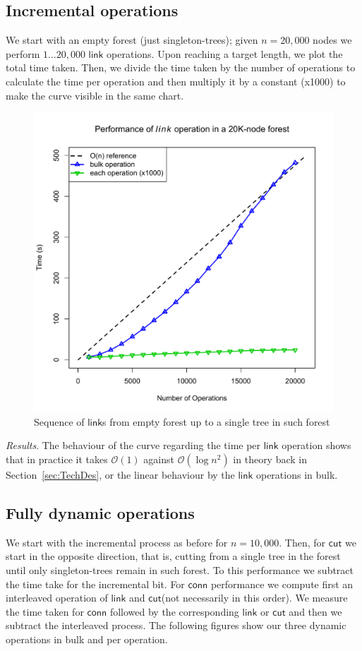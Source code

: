 \documentclass{elsarticle}
\newcommand{\MATHSF}[1]{\ensuremath{\mathsf{#1}}\xspace}
\newcommand{\link}{\MATHSF{link}}
\newcommand{\cut}{\MATHSF{cut}}
\newcommand{\conn}{\MATHSF{conn}}
\renewcommand{\O}{\ensuremath{\mathcal{O}}}
\begin{document}
\subsection{Incremental operations} 
We start with an empty forest (just singleton-trees); given $n=20,000$ nodes we perform $1 \ldots 20,000$ \link operations. Upon reaching a target length, we plot the total time taken. Then, we divide the time taken by the number of operations to calculate the time per operation and then multiply it by a constant (x1000) to make the curve visible in the same chart.

\begin{figure}[H]
\begin{center}
\includegraphics[scale=0.4]{./Images/plotLink} 
\end{center}
\caption{Sequence of {\link}s from empty forest up to a single tree in such forest}
\label{fig:incLink}
\end{figure}

\textit{\emph{Results}}. The behaviour of the curve regarding the time per \link operation shows that in practice it takes $\O(1)$ against $\O(\log n^2)$ in theory back in Section~\ref{sec:TechDes}, or the linear behaviour by the \link operations in bulk.

\subsection{Fully dynamic operations} 
We start with the incremental process as before for $n=10,000$. Then, for \cut we start in the opposite direction, that is, cutting from a single tree in the forest until only singleton-trees remain in such forest. To this performance we subtract the time take for the incremental bit. For \conn performance we compute first an interleaved operation of \link and \cut (not necessarily in this order). We measure the time taken for \conn followed by the corresponding \link or \cut and then we subtract the interleaved process. The following figures show our three dynamic operations in bulk and per operation.
\end{document}
